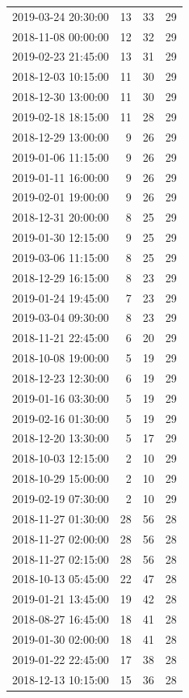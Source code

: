 \begin{tabular}{lrrr}
2019-03-24 20:30:00 & 13 & 33 & 29 \\
2018-11-08 00:00:00 & 12 & 32 & 29 \\
2019-02-23 21:45:00 & 13 & 31 & 29 \\
2018-12-03 10:15:00 & 11 & 30 & 29 \\
2018-12-30 13:00:00 & 11 & 30 & 29 \\
2019-02-18 18:15:00 & 11 & 28 & 29 \\
2018-12-29 13:00:00 & 9 & 26 & 29 \\
2019-01-06 11:15:00 & 9 & 26 & 29 \\
2019-01-11 16:00:00 & 9 & 26 & 29 \\
2019-02-01 19:00:00 & 9 & 26 & 29 \\
2018-12-31 20:00:00 & 8 & 25 & 29 \\
2019-01-30 12:15:00 & 9 & 25 & 29 \\
2019-03-06 11:15:00 & 8 & 25 & 29 \\
2018-12-29 16:15:00 & 8 & 23 & 29 \\
2019-01-24 19:45:00 & 7 & 23 & 29 \\
2019-03-04 09:30:00 & 8 & 23 & 29 \\
2018-11-21 22:45:00 & 6 & 20 & 29 \\
2018-10-08 19:00:00 & 5 & 19 & 29 \\
2018-12-23 12:30:00 & 6 & 19 & 29 \\
2019-01-16 03:30:00 & 5 & 19 & 29 \\
2019-02-16 01:30:00 & 5 & 19 & 29 \\
2018-12-20 13:30:00 & 5 & 17 & 29 \\
2018-10-03 12:15:00 & 2 & 10 & 29 \\
2018-10-29 15:00:00 & 2 & 10 & 29 \\
2019-02-19 07:30:00 & 2 & 10 & 29 \\
2018-11-27 01:30:00 & 28 & 56 & 28 \\
2018-11-27 02:00:00 & 28 & 56 & 28 \\
2018-11-27 02:15:00 & 28 & 56 & 28 \\
2018-10-13 05:45:00 & 22 & 47 & 28 \\
2019-01-21 13:45:00 & 19 & 42 & 28 \\
2018-08-27 16:45:00 & 18 & 41 & 28 \\
2019-01-30 02:00:00 & 18 & 41 & 28 \\
2019-01-22 22:45:00 & 17 & 38 & 28 \\
2018-12-13 10:15:00 & 15 & 36 & 28 \\

\end{tabular}
